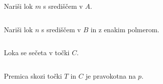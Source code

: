    \begin{columns}
	   \begin{column}{0.55\textwidth}
		   Nariši lok $m$ s središčem v $A$.
	   \end{column}
		   \begin{column}{0.45\textwidth}
			   \centering
			   \begin{tikzpicture}
				
			   \end{tikzpicture}
		   \end{column}
	   \end{columns}


	   \begin{columns}
		   \begin{column}{0.55\textwidth}
			   Nariši lok $n$ s središčem v $B$ in z enakim polmerom.
		   \end{column}
			   \begin{column}{0.45\textwidth}
				   \centering
				   \begin{tikzpicture}
					
				   \end{tikzpicture}
			   \end{column}
		   \end{columns}


		   \begin{columns}
			   \begin{column}{0.55\textwidth}
				   Loka se sečeta v točki $C$.
			   \end{column}
				   \begin{column}{0.45\textwidth}
					   \centering
					   \begin{tikzpicture}
						
					   \end{tikzpicture}
				   \end{column}
			   \end{columns}


			   \begin{columns}
				   \begin{column}{0.55\textwidth}
					   Premica skozi točki $T$ in $C$ je pravokotna na $p$.
				   \end{column}
					   \begin{column}{0.45\textwidth}
						   \centering
						   \begin{tikzpicture}
							
						   \end{tikzpicture}
					   \end{column}
				   \end{columns}



